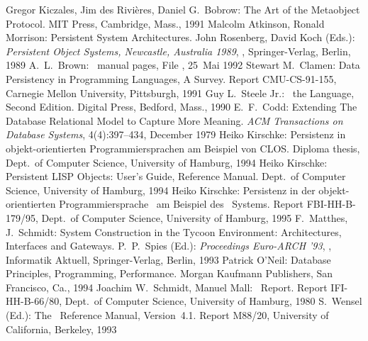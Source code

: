 \documentclass[a4paper%
]{article}
\newcommand{\etal}{+}
\newcommand{\inpea}[1]{%
P.\ P.\ Spies (Ed.):
{\em Proceedings Euro-ARCH '93\/},
\citepage{#1},
Informatik Aktuell,
Springer-Verlag, Berlin, 1993}
\newcommand{\inpos}[1]{%
John Rosenberg, David Koch (Eds.):
{\em Persistent Object Systems,
Newcastle, Australia 1989\/},
\citepage{#1},
Springer-Verlag, Berlin, 1989}
\begin{document}
\begin{thebibliography}{Sch\etal\ 80}
%
Gregor Kiczales, Jim des Rivi\`{e}res, Daniel G.\ Bobrow: The Art of
the Metaobject Protocol.  MIT Press, Cambridge, Mass., 1991
%
\bibitem[Atk\etal\ 89]{bib:at89}
Malcolm Atkinson, Ronald Morrison:
Persistent System Architectures.
\inpos{73--97}
%
A.\ L.\ Brown:
\sh\ manual pages,
File ,
25~Mai 1992
%
Stewart M.\ Clamen:
Data Persistency in Programming Languages, A Survey.
Report CMU-CS-91-155,
Carnegie Mellon University, Pittsburgh,
1991
%
Guy L.\ Steele Jr.:
\cl\ the Language, Second Edition.
Digital Press, Bedford, Mass., 1990
%
E.\ F.\ Codd:
Extending The Database Relational Model to Capture More Meaning.
{\em ACM Transactions on Database Systems\/},
4(4):397--434, December 1979
%
Heiko Kirschke:
Persistenz in objekt-orientierten Programmiersprachen am Beispiel von
CLOS.
Diploma thesis,
Dept.\ of Computer Science, University of Hamburg,
1994
%
Heiko Kirschke:
Persistent LISP Objects:
User's Guide, Reference Manual.
Dept.\ of Computer Science, University of Hamburg,
1994
%
Heiko Kirschke:
Persistenz in der objekt-orientierten
Programmiersprache \clos\ am Beispiel
des \plob\ Systems.
Report FBI-HH-B-179/95,
Dept.\ of Computer Science, University of Hamburg,
1995
%
\bibitem[Mat\etal\ 93]{bib:ma93}
F.\ Matthes, J.\ Schmidt:
System Construction in the Tycoon Environment:
Architectures, Interfaces and Gateways.
\inpea{301--317}
%
Patrick O'Neil:
Database Principles, Programming, Performance.
Morgan Kaufmann Publishers, San Francisco, Ca., 1994
%
\bibitem[Sch\etal\ 80]{bib:schm80}
Joachim W.\ Schmidt, Manuel Mall:
\pascalr\ Report.
Report IFI-HH-B-66/80,
Dept.\ of Computer Science, University of Hamburg,
1980
%
S.\ Wensel (Ed.):
The \postgres\ Reference Manual,
Version~4.1.
Report M88/20, University of California, Berkeley, 1993
%
\end{thebibliography}
\end{document}
